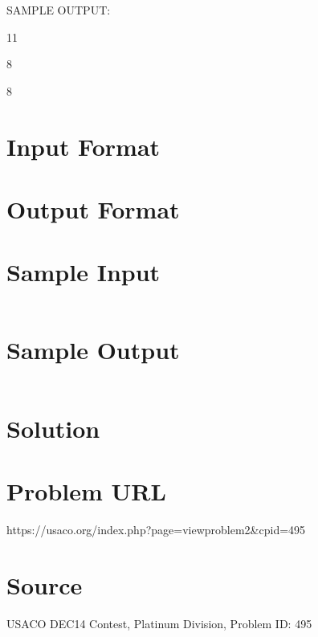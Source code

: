 \documentclass[12pt]{article}
\begin{document}
SAMPLE OUTPUT:



11

8

8




\section*{Input Format}


\section*{Output Format}


\section*{Sample Input}
\begin{verbatim}

\end{verbatim}

\section*{Sample Output}
\begin{verbatim}

\end{verbatim}

\section*{Solution}


\section*{Problem URL}
https://usaco.org/index.php?page=viewproblem2&cpid=495

\section*{Source}
USACO DEC14 Contest, Platinum Division, Problem ID: 495
\end{document}
